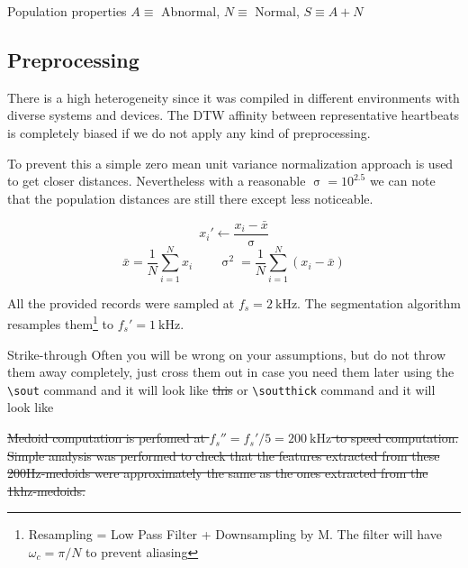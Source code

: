\documentclass{project-logbook}
\begin{document}
{\begin{table}[ht]
    \caption{Population properties $A \equiv$ Abnormal, $N\equiv$ Normal, $S\equiv A+N$}
    \label{tab:populations}
\end{table}

\subsection{Preprocessing} %
\label{sub:preprocessing}

There is a high heterogeneity since it was compiled in different environments with diverse systems and devices. The DTW affinity between representative heartbeats is completely biased if we do not apply any kind of preprocessing.

To prevent this a simple zero mean unit variance normalization approach is used to get closer distances. Nevertheless with a reasonable $\upsigma  = 10^{2.5}$ we can note that the population distances are still there except less noticeable.

\begin{equation}
    x_i' \gets \frac{x_i-\bar{x}}{\upsigma}
\end{equation}
\begin{equation}
    \bar{x} = \frac{1}{N}\sum_{i=1}^{N} x_i \qquad \upsigma^2 = {\frac{1}{N}\sum_{i=1}^{N} (x_i-\bar{x})}
\end{equation}

All the provided records were sampled at $f_s = \SI{2}{\kilo\Hz}$. The segmentation algorithm resamples them\footnote{Resampling = Low Pass Filter + Downsampling by M. The filter will have $\omega_c = \pi/N$ to prevent aliasing} to $ f_s' = \SI{1}{\kilo\Hz}$.
\begin{tipt}{Strike-through}
 Often you will be wrong on your assumptions, but do not throw them away completely, just cross them out in case you need them later using the \texttt{\textbackslash sout} command and it will look like \sout{this} or \texttt{\textbackslash soutthick} command and it will look like 
\end{tipt}

\sout{Medoid computation is perfomed at $f_s'' = f_s'/5 = \SI{200}{\kilo\hertz}$ to speed computation. Simple analysis was performed to check that the features extracted from these 200Hz-medoids were approximately the same as the ones extracted from the  1khz-medoids.}


}
\end{document}
